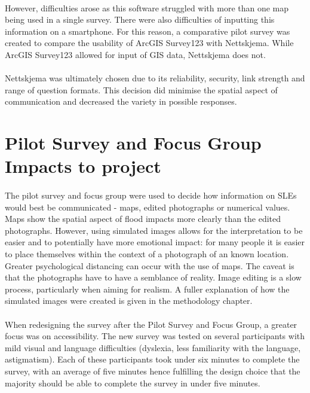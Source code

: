 \paragraph{}

However, difficulties arose as this software struggled with more than one map being used in a single survey. There were also difficulties of inputting this information on a smartphone. For this reason, a comparative pilot survey was created to compare the usability of ArcGIS Survey123 with Nettskjema. While ArcGIS Survey123 allowed for input of GIS data, Nettskjema does not.
\paragraph{}
Nettskjema was ultimately chosen due to its reliability, security, link strength and range of question formats.  This decision did minimise the spatial aspect of communication and decreased the variety in possible responses.
\section{Pilot Survey and Focus Group Impacts to project}
 
\paragraph{}
The pilot survey and focus group were used to decide how information on SLEs would best be communicated - maps, edited photographs or numerical values. Maps show the spatial aspect of flood impacts more clearly than the edited photographs. However, using simulated images allows for the interpretation to be easier and to potentially have more emotional impact: for many people it is easier to place themselves within the context of a photograph of an known location. Greater psychological distancing can occur with the use of maps. The caveat is that the photographs have to have a semblance of reality. Image editing is a slow process, particularly when aiming for realism.  A fuller explanation of how the simulated images were created is given in the methodology chapter. 
\paragraph{}

When redesigning the survey after the Pilot Survey and Focus Group, a greater focus was on accessibility. The new survey was tested on several participants with mild visual and language difficulties (dyslexia, less familiarity with the language, astigmatism).  Each of these participants took under six minutes to complete the survey, with an average of five minutes hence fulfilling the design choice that the majority should be able to complete the survey in under five minutes. 
